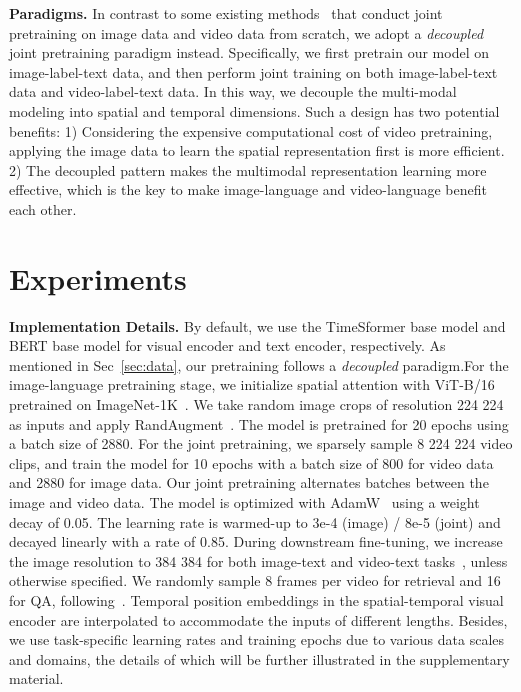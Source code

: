 \documentclass{article}
\begin{document}
\textbf{Paradigms.} In contrast to some existing methods~\cite{bain2021frozen,fu2021violet} that conduct joint pretraining on image data and video data from scratch, we adopt a \emph{decoupled} joint pretraining paradigm instead. Specifically, we first pretrain our model on image-label-text data, and then perform joint training on both image-label-text data and video-label-text data. In this way, we decouple the multi-modal modeling into spatial and temporal dimensions. Such a design has two potential benefits: 1) Considering the expensive computational cost of video pretraining, applying the image data to learn the spatial representation first is more efficient. 2) The decoupled pattern makes the multimodal representation learning more effective, which is the key to make image-language and video-language benefit each other. 

\section{Experiments}
\noindent\textbf{Implementation Details.} 
By default, we use the TimeSformer base model and BERT base model for visual encoder and text encoder, respectively. As mentioned in Sec~\ref{sec:data}, our pretraining follows a \emph{decoupled} paradigm.For the image-language pretraining stage, we initialize spatial attention with ViT-B/16~\cite{dosovitskiy2020image} pretrained on ImageNet-1K~\cite{deng2009imagenet}. We take
random image crops of resolution 224  224 as inputs and apply RandAugment~\cite{cubuk2020randaugment}. The model is pretrained for 20 epochs using a batch size of 2880. For the joint pretraining, we sparsely sample 8  224  224 video clips, and train the model for 10 epochs with a batch size of 800 for video data and 2880 for image data. Our joint
pretraining alternates batches between the
image and video data. The model is optimized with AdamW~\cite{loshchilov2017decoupled} using a weight decay of 0.05. The learning rate is warmed-up to 3e-4 (image) / 8e-5 (joint) and decayed linearly with a rate of 0.85. During downstream fine-tuning, we increase the image resolution to 384  384 for both image-text and video-text tasks~\cite{li2021align,li2022blip}, unless otherwise specified. We randomly sample 8 frames per video for retrieval and 16 for QA, following~\cite{li2021prompt}. Temporal position embeddings in the spatial-temporal visual encoder are interpolated to accommodate the inputs of different lengths. Besides, we use task-specific learning rates and training epochs due to various data scales and domains, the details of which will be further illustrated in the supplementary material. 
\end{document}
